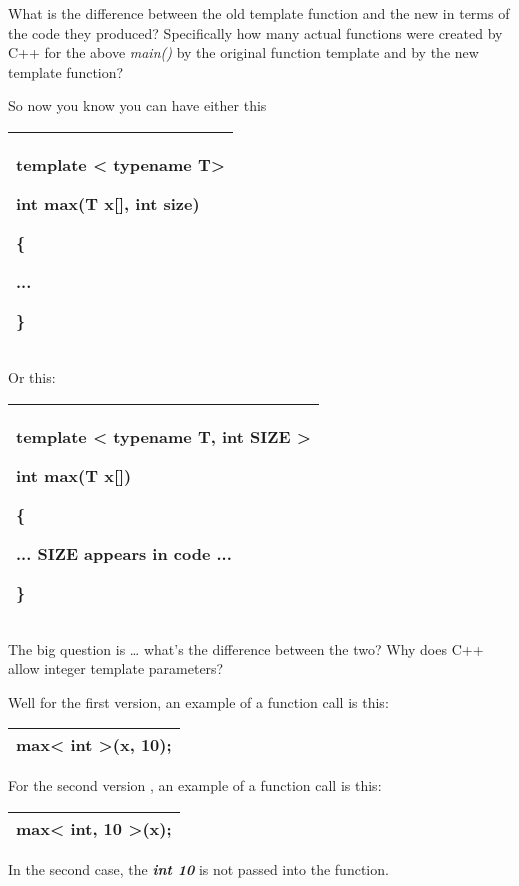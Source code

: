 \documentclass[
]{article}
\begin{document}
What is the difference between the old template function and the new in
terms of the code they produced? Specifically how many actual functions
were created by C++ for the above \emph{main()} by the original function
template and by the new template function?

So now you know you can have either this\textbf{ }

\begin{longtable}[]{@{}l@{}}
\toprule
\endhead
\begin{minipage}[t]{0.97\columnwidth}\raggedright
template \textless{} typename T\textgreater{}

int max(T x{[}{]}, int size)

\{

...

\}\strut
\end{minipage}\tabularnewline
\bottomrule
\end{longtable}

Or this:

\begin{longtable}[]{@{}l@{}}
\toprule
\endhead
\begin{minipage}[t]{0.97\columnwidth}\raggedright
template \textless{} typename T, int SIZE \textgreater{}

int max(T x{[}{]})

\{

... SIZE appears in code ...

\}\strut
\end{minipage}\tabularnewline
\bottomrule
\end{longtable}

The big question is \ldots{} what's the difference between the two? Why
does C++ allow integer template parameters?

Well for the first version, an example of a function call is this:

\begin{longtable}[]{@{}l@{}}
\toprule
\endhead
max\textless{} int \textgreater(x, 10); \tabularnewline
\bottomrule
\end{longtable}

For the second version , an example of a function call is this:

\begin{longtable}[]{@{}l@{}}
\toprule
\endhead
max\textless{} int, 10 \textgreater(x); \tabularnewline
\bottomrule
\end{longtable}

In the second case, the \emph{\textbf{int 10}} is not passed into the
function.
\end{document}
